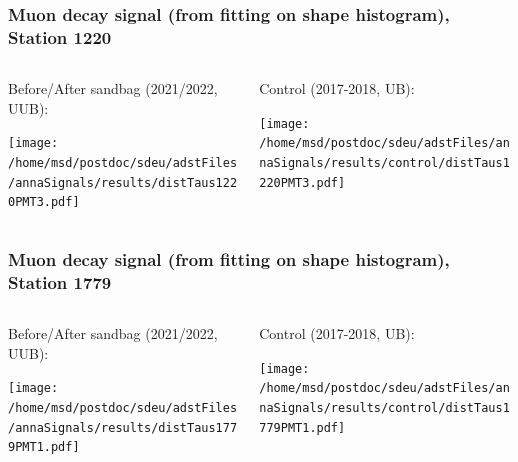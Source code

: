 \documentclass[aspectratio=169]{beamer}
\begin{document}
\begin{frame}
  \frametitle{Muon decay signal (from fitting on shape histogram), Station 1220}
  
  \begin{columns}[T,c]
    \begin{column}{.5\textwidth}
      Before/After sandbag (2021/2022, UUB):
      \vspace{.3cm}

      \texttt{[image: /home/msd/postdoc/sdeu/adstFiles/annaSignals/results/distTaus1220PMT3.pdf]}
    \end{column}
    \begin{column}{.5\textwidth}
      Control (2017-2018, UB):
      \vspace{0.3cm}

      \texttt{[image: /home/msd/postdoc/sdeu/adstFiles/annaSignals/results/control/distTaus1220PMT3.pdf]}
    \end{column}    
\end{columns}
\end{frame}



\begin{frame}
  \frametitle{Muon decay signal (from fitting on shape histogram), Station 1779}
  
  \begin{columns}[T,c]
    \begin{column}{.5\textwidth}
      Before/After sandbag (2021/2022, UUB):
      \vspace{.3cm}

      \texttt{[image: /home/msd/postdoc/sdeu/adstFiles/annaSignals/results/distTaus1779PMT1.pdf]}
    \end{column}
    \begin{column}{.5\textwidth}
      Control (2017-2018, UB):
      \vspace{0.3cm}

      \texttt{[image: /home/msd/postdoc/sdeu/adstFiles/annaSignals/results/control/distTaus1779PMT1.pdf]}
    \end{column}
  \end{columns}
\end{frame}
\end{document}

